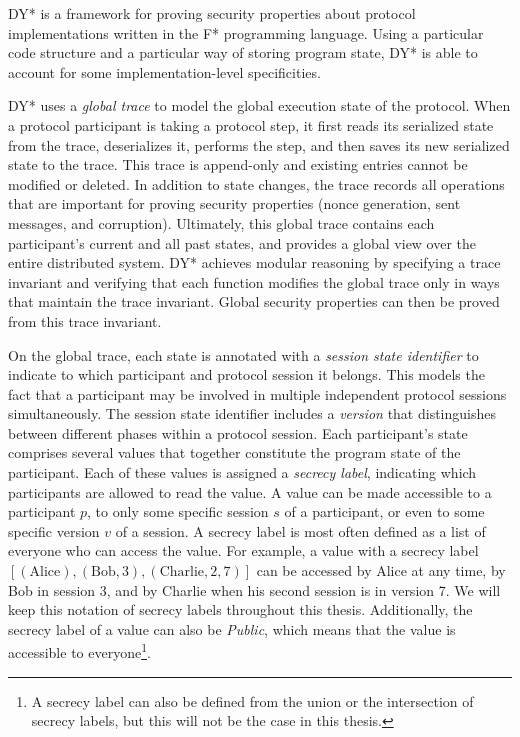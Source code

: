 DY*\cite{} is a framework for proving security properties about protocol implementations written in the F* programming language.
Using a particular code structure and a particular way of storing program state, DY* is able to account for some implementation-level specificities.

DY* uses a \emph{global trace} to model the global execution state of the protocol.
When a protocol participant is taking a protocol step, it first reads its serialized state from the trace, deserializes it, performs the step, and then saves its new serialized state to the trace. This trace is append-only and existing entries cannot be modified or deleted. In addition to state changes, the trace records all operations that are important for proving security properties (nonce generation, sent messages, and corruption).
Ultimately, this global trace contains each participant's current and all past states, and provides a global view over the entire distributed system. %
DY* achieves modular reasoning by specifying a trace invariant and verifying that each function modifies the global trace only in ways that maintain the trace invariant. Global security properties can then be proved from this trace invariant.

On the global trace, each state is annotated with a \emph{session state identifier} to indicate to which participant and protocol session it belongs. This models the fact that a participant may be involved in multiple independent protocol sessions simultaneously. The session state identifier includes a \emph{version} that distinguishes between different phases within a protocol session.%
Each participant's state comprises several values that together constitute the program state of the participant. Each of these values is assigned a \emph{secrecy label}, indicating which participants are allowed to read the value.
A value can be made accessible to a participant $p$, to only some specific session $s$ of a participant, or even to some specific version $v$ of a session.
A secrecy label is most often defined as a list of everyone who can access the value. For example, a value with a secrecy label $[(\text{Alice}), (\text{Bob}, 3), (\text{Charlie}, 2, 7)]$ can be accessed by Alice at any time, by Bob in session 3, and by Charlie when his second session is in version 7. We will keep this notation of secrecy labels throughout this thesis.
Additionally, the secrecy label of a value can also be \emph{Public}, which means that the value is accessible to everyone\footnote{A secrecy label can also be defined from the union or the intersection of secrecy labels, but this will not be the case in this thesis.}.

